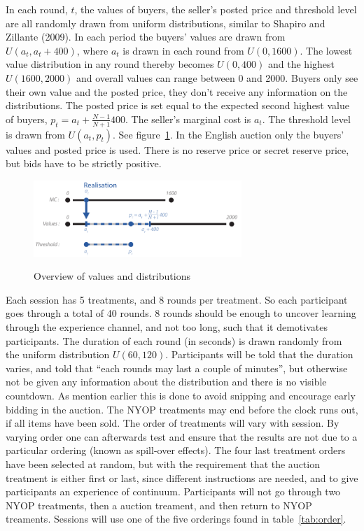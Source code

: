 \documentclass[a4paper,12pt]{article}
\begin{document}
	In each round, $t$, the values of buyers, the seller's posted price and threshold level are all randomly drawn from uniform distributions, similar to Shapiro and Zillante (2009). In each period the buyers' values are drawn from $U(a_t , a_t + 400)$, where $a_t$ is drawn in each round from $U(0, 1600)$. The lowest value distribution in any round thereby becomes $U(0, 400)$ and the highest $U(1600, 2000)$ and overall values can range between 0 and 2000. Buyers only see their own value and the posted price, they don't receive any information on the distributions. The posted price is set equal to the expected second highest value of buyers, $p_t = a_t + \frac{N-1}{N+1}400$. The seller's marginal cost is $a_t$. The threshold level is drawn from $U(a_t, p_t)$. See figure~\ref{fig:distribution}. In the English auction only the buyers' values and posted price is used. There is no reserve price or secret reserve price, but bids have to be strictly positive.
	
	\begin{figure}[h]
	        \centering
	        \caption{Overview of values and distributions}
	        \includegraphics[width=0.7\textwidth]{Figures/Distribution}
			\label{fig:distribution}
	\end{figure}

	Each session has 5 treatments, and 8 rounds per treatment. So each participant goes through a total of 40 rounds. 8 rounds should be enough to uncover learning through the experience channel, and not too long, such that it demotivates participants. The duration of each round (in seconds) is drawn randomly from the uniform distribution $U(60, 120)$. Participants will be told that the duration varies, and told that ``each rounds may last a couple of minutes'', but otherwise not be given any information about the distribution and there is no visible countdown. As mention earlier this is done to avoid snipping and encourage early bidding in the auction. The NYOP treatments may end before the clock runs out, if all items have been sold. The order of treatments will vary with session. By varying order one can afterwards test and ensure that the results are not due to a particular ordering (known as spill-over effects). The four last treatment orders have been selected at random, but with the requirement that the auction treatment is either first or last, since different instructions are needed, and to give participants an experience of continuum. Participants will not go through two NYOP treatments, then a auction treament, and then return to NYOP treaments. Sessions will use one of the five orderings found in table~\ref{tab:order}.
\end{document}
